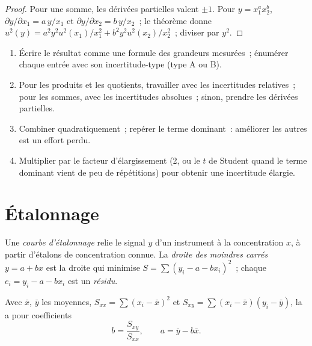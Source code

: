 \begin{proof}
Pour une somme, les dérivées partielles valent $\pm1$. Pour $y = x_1^ax_2^b$, $\partial y/\partial x_1 =
a\,y/x_1$ et $\partial y/\partial x_2 = b\,y/x_2$~; le théorème donne $u^2(y) = a^2y^2u^2(x_1)/x_1^2 +
b^2y^2u^2(x_2)/x_2^2$~; diviser par $y^2$.
\end{proof}

\begin{method}[Propager]\label{met:b2:measurement-statistics:propagate}
\begin{enumerate}
  \item Écrire le résultat comme une formule des grandeurs mesurées~; énumérer chaque entrée avec son
        incertitude-type (type A ou B).
  \item Pour les produits et les quotients, travailler avec les incertitudes relatives~; pour les sommes,
        avec les incertitudes absolues~; sinon, prendre les dérivées partielles.
  \item Combiner quadratiquement~; repérer le terme dominant~: améliorer les autres est un effort perdu.
  \item Multiplier par le facteur d'élargissement (2, ou le $t$ de Student quand le terme dominant vient
        de peu de répétitions) pour obtenir une incertitude élargie.
\end{enumerate}
\end{method}

\section{Étalonnage}

\begin{definition}\label{def:b2:measurement-statistics:calibration}
Une \emph{courbe d'étalonnage} relie le signal $y$ d'un
instrument à la concentration $x$, à partir d'étalons de concentration connue. La \emph{droite des
moindres carrés} $y = a + bx$ est la droite qui minimise $S = \sum (y_i - a -
bx_i)^2$~; chaque $e_i = y_i - a - bx_i$ est un \emph{résidu}.
\end{definition}

\begin{theorem}\label{thm:b2:measurement-statistics:least-squares}
Avec $\bar x$, $\bar y$ les moyennes, $S_{xx} = \sum(x_i - \bar x)^2$ et $S_{xy} = \sum(x_i - \bar x)(y_i -
\bar y)$, la  a pour coefficients
\begin{equation*}
b = \frac{S_{xy}}{S_{xx}}, \qquad a = \bar y - b\bar x.
\end{equation*}
\end{theorem}

